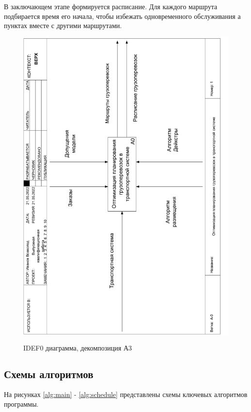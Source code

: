 В заключающем этапе формируется расписание. Для каждого маршрута подбирается время его начала, чтобы избежать одновременного обслуживания а пунктах вместе с другими маршрутами.

\pagebreak
\begin{figure}[h]
	\begin{center}
		{\includegraphics[scale=0.63, angle=-90, page=6]{img/idef0.pdf}}
		\caption{IDEF0 диаграмма, декомпозиция А3}
		\label{idef0:A3}
	\end{center}
\end{figure}

\subsection{Схемы алгоритмов}
На рисунках \ref{alg:main} - \ref{alg:schedule} представлены схемы ключевых алгоритмов программы.

